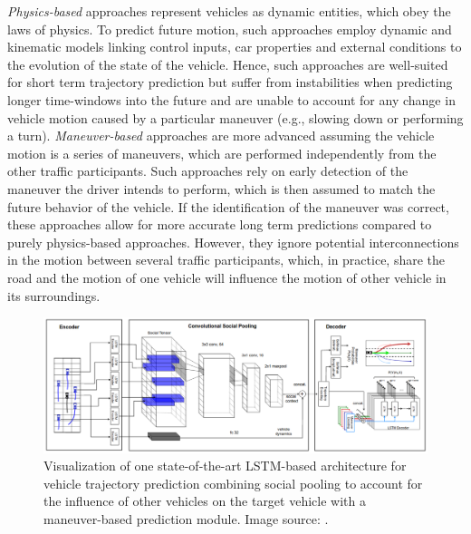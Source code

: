 \emph{Physics-based} approaches represent vehicles as dynamic entities, which obey the laws of physics.
To predict future motion, such approaches employ dynamic and kinematic models linking control inputs, car properties and external conditions to the evolution of the state of the vehicle.
Hence, such approaches are well-suited for short term trajectory prediction but suffer from instabilities when predicting longer time-windows into the future and are unable to account for any change in vehicle motion caused by a particular maneuver (e.g., slowing down or performing a turn). 
\emph{Maneuver-based} approaches are more advanced assuming the vehicle motion is a series  of maneuvers, which are performed independently from the other traffic participants.
Such approaches rely on early detection of the maneuver the driver intends to perform, which is then assumed to match the future behavior of the vehicle.
If the identification of the maneuver was correct, these approaches allow for more accurate long term predictions compared to purely physics-based approaches.
However, they ignore potential interconnections in the motion between several traffic participants, which, in practice, share the road and the motion of one vehicle will influence the motion of other vehicle in its surroundings.

\begin{figure}[t!]
    \centering
    \includegraphics[width=0.95\linewidth]{imgs/deo_lstm_prediction_arch.png}
    \caption{Visualization of one state-of-the-art \ac{LSTM}-based architecture for vehicle trajectory prediction combining social pooling to account for the influence of other vehicles on the target vehicle with a maneuver-based prediction module. Image source: \textcite{Deo2018a}.}
    \label{fig:deo_lstm_prediction_arch}
\end{figure}

